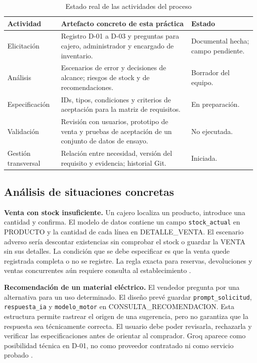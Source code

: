 \begin{table}[!ht]
\centering\scriptsize
\caption{Estado real de las actividades del proceso}
\label{tab:proceso}
\begin{tabularx}{\columnwidth}{@{}P{1.25cm}Y P{1.55cm}@{}}
\toprule Actividad & Artefacto concreto de esta práctica & Estado\\\midrule
Elicitación & Registro D-01 a D-03 y preguntas para cajero, administrador y encargado de inventario. & Documental hecha; campo pendiente.\\
Análisis & Escenarios de error y decisiones de alcance; riesgos de stock y de recomendaciones. & Borrador del equipo.\\
Especificación & IDs, tipos, condiciones y criterios de aceptación para la matriz de requisitos. & En preparación.\\
Validación & Revisión con usuarios, prototipo de venta y pruebas de aceptación de un conjunto de datos de ensayo. & No ejecutada.\\
Gestión transversal & Relación entre necesidad, versión del requisito y evidencia; historial Git. & Iniciada.\\
\bottomrule
\end{tabularx}
\end{table}

\subsection{Análisis de situaciones concretas}
\textbf{Venta con stock insuficiente.} Un cajero localiza un producto, introduce una cantidad y confirma. El modelo de datos contiene un campo \texttt{stock\_actual} en PRODUCTO y la cantidad de cada línea en DETALLE\_VENTA. El escenario adverso sería descontar existencias sin comprobar el stock o guardar la VENTA sin sus detalles. La condición que se debe especificar es que la venta quede registrada completa o no se registre. La regla exacta para reservas, devoluciones y ventas concurrentes aún requiere consulta al establecimiento \cite{erPFC2026}.

\textbf{Recomendación de un material eléctrico.} El vendedor pregunta por una alternativa para un uso determinado. El diseño prevé guardar \texttt{prompt\_solicitud}, \texttt{respuesta\_ia} y \texttt{modelo\_motor} en CONSULTA\_RECOMENDACION. Esta estructura permite rastrear el origen de una sugerencia, pero no garantiza que la respuesta sea técnicamente correcta. El usuario debe poder revisarla, rechazarla y verificar las especificaciones antes de orientar al comprador. Groq aparece como posibilidad técnica en D-01, no como proveedor contratado ni como servicio probado \cite{basePFC2026,erPFC2026}.


